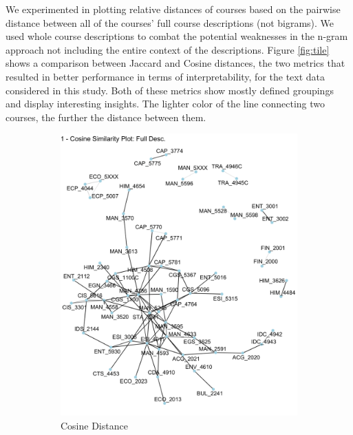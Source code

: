 We experimented in plotting relative distances of courses based on the pairwise distance between all of the courses' full course descriptions (not bigrams).  We used whole course descriptions to combat the potential weaknesses in the n-gram approach not including the entire context of the descriptions.   Figure \ref{fig:tile} shows a comparison between Jaccard and Cosine distances, the two metrics that resulted in better performance in terms of interpretability,  for the text data considered in this study. Both of these metrics show mostly defined groupings and display interesting insights. The lighter color of the line connecting two courses, the further the distance between them.


\begin{figure}[H]
\centering
\begin{subfigure}{.5\textwidth}
  \centering
  \includegraphics[width=1\linewidth]{Content/images/cos.png}
  \caption{Cosine Distance}
  \label{fig:cos}
\end{subfigure}%
\begin{subfigure}{.5\textwidth}
  \centering

\end{subfigure}
\end{figure}
